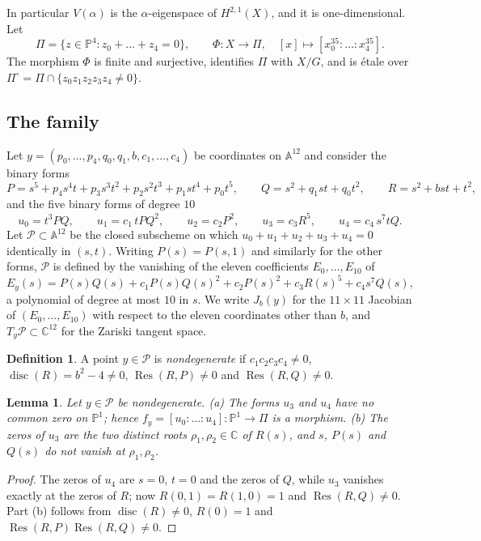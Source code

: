\documentclass[11pt]{amsart}
\newtheorem{lemma}[theorem]{Lemma}
\theoremstyle{definition}
\newtheorem{definition}[theorem]{Definition}
\theoremstyle{remark}
\numberwithin{equation}{section}
\newcommand{\C}{\mathbb{C}}
\newcommand{\PP}{\mathbb{P}}
\newcommand{\Aff}{\mathbb{A}}
\newcommand{\cP}{\mathcal{P}}
\newcommand{\Res}{\mathop{\mathrm{Res}}\nolimits}
\newcommand{\disc}{\mathop{\mathrm{disc}}\nolimits}
\begin{document}
In particular $V(\alpha)$ is the $\alpha$-eigenspace of $H^{2,1}(X)$, and it is one-dimensional. Let
\[
\Pi=\{z\in\PP^4:z_0+\dots+z_4=0\},\qquad \Phi\colon X\to\Pi,\quad [x]\mapsto[x_0^{35}:\dots:x_4^{35}].
\]
The morphism $\Phi$ is finite and surjective, identifies $\Pi$ with $X/G$, and is \'etale over $\Pi^\circ=\Pi\cap\{z_0z_1z_2z_3z_4\ne0\}$.

\subsection{The family}\label{subsec:family}
Let $y=(p_0,\dots,p_4,q_0,q_1,b,c_1,\dots,c_4)$ be coordinates on $\Aff^{12}$ and consider the binary forms
\[
P=s^5+p_4s^4t+p_3s^3t^2+p_2s^2t^3+p_1st^4+p_0t^5,\qquad Q=s^2+q_1st+q_0t^2,\qquad R=s^2+bst+t^2,
\]
and the five binary forms of degree $10$
\begin{equation}\label{eq:u}
u_0=t^3PQ,\qquad u_1=c_1\,tPQ^2,\qquad u_2=c_2P^2,\qquad u_3=c_3R^5,\qquad u_4=c_4\,s^7tQ .
\end{equation}
Let $\cP\subset\Aff^{12}$ be the closed subscheme on which $u_0+u_1+u_2+u_3+u_4=0$ identically in $(s,t)$. Writing $P(s)=P(s,1)$ and similarly for the other forms, $\cP$ is defined by the vanishing of the eleven coefficients $E_0,\dots,E_{10}$ of
\begin{equation}\label{eq:E}
E_y(s)=P(s)Q(s)+c_1P(s)Q(s)^2+c_2P(s)^2+c_3R(s)^5+c_4s^7Q(s),
\end{equation}
a polynomial of degree at most $10$ in $s$. We write $J_b(y)$ for the $11\times11$ Jacobian of $(E_0,\dots,E_{10})$ with respect to the eleven coordinates other than $b$, and $T_y\cP\subset\C^{12}$ for the Zariski tangent space.

\begin{definition}\label{def:nondeg}
A point $y\in\cP$ is \emph{nondegenerate} if $c_1c_2c_3c_4\ne0$, $\disc(R)=b^2-4\ne0$, $\Res(R,P)\ne0$ and $\Res(R,Q)\ne0$.
\end{definition}

\begin{lemma}\label{lem:nondeg}
Let $y\in\cP$ be nondegenerate. (a) The forms $u_3$ and $u_4$ have no common zero on $\PP^1$; hence $f_y=[u_0:\dots:u_4]\colon\PP^1\to\Pi$ is a morphism. (b) The zeros of $u_3$ are the two distinct roots $\rho_1,\rho_2\in\C$ of $R(s)$, and $s$, $P(s)$ and $Q(s)$ do not vanish at $\rho_1,\rho_2$.
\end{lemma}

\begin{proof}
The zeros of $u_4$ are $s=0$, $t=0$ and the zeros of $Q$, while $u_3$ vanishes exactly at the zeros of $R$; now $R(0,1)=R(1,0)=1$ and $\Res(R,Q)\ne0$. Part (b) follows from $\disc(R)\ne0$, $R(0)=1$ and $\Res(R,P)\Res(R,Q)\ne0$.
\end{proof}
\end{document}
